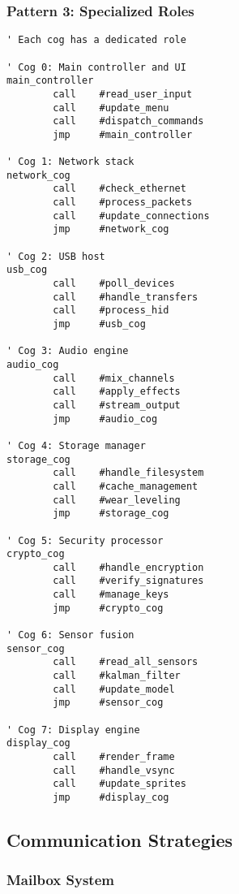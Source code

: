 \documentclass[11pt]{book}
\begin{document}
\hypertarget{pattern-3-specialized-roles}{%
\subsubsection{Pattern 3: Specialized
Roles}\label{pattern-3-specialized-roles}}

\begin{lstlisting}
' Each cog has a dedicated role

' Cog 0: Main controller and UI
main_controller
        call    #read_user_input
        call    #update_menu
        call    #dispatch_commands
        jmp     #main_controller

' Cog 1: Network stack
network_cog
        call    #check_ethernet
        call    #process_packets
        call    #update_connections
        jmp     #network_cog

' Cog 2: USB host
usb_cog
        call    #poll_devices
        call    #handle_transfers
        call    #process_hid
        jmp     #usb_cog

' Cog 3: Audio engine
audio_cog
        call    #mix_channels
        call    #apply_effects
        call    #stream_output
        jmp     #audio_cog

' Cog 4: Storage manager
storage_cog
        call    #handle_filesystem
        call    #cache_management
        call    #wear_leveling
        jmp     #storage_cog

' Cog 5: Security processor
crypto_cog
        call    #handle_encryption
        call    #verify_signatures
        call    #manage_keys
        jmp     #crypto_cog

' Cog 6: Sensor fusion
sensor_cog
        call    #read_all_sensors
        call    #kalman_filter
        call    #update_model
        jmp     #sensor_cog

' Cog 7: Display engine
display_cog
        call    #render_frame
        call    #handle_vsync
        call    #update_sprites
        jmp     #display_cog
\end{lstlisting}

\hypertarget{communication-strategies}{%
\subsection{Communication Strategies}\label{communication-strategies}}

\hypertarget{mailbox-system}{%
\subsubsection{Mailbox System}\label{mailbox-system}}
\end{document}
